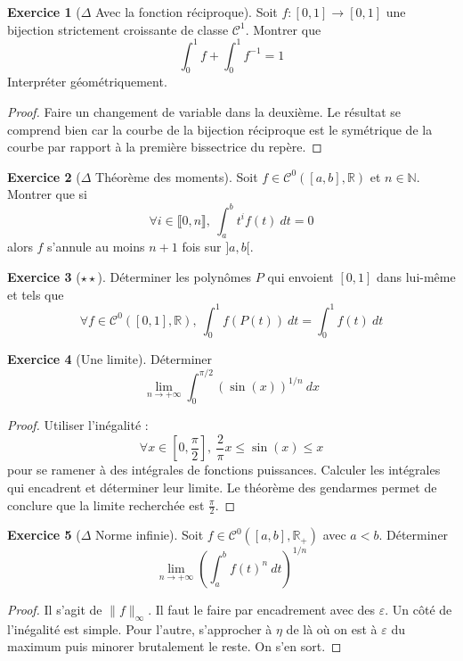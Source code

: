 \documentclass[french]{book}
\newcommand{\N}{\mathbb{N}}
\newcommand{\R}{\mathbb{R}}
\newcommand{\inv}{^{-1}}
\theoremstyle{definition}
\newtheorem{ex}{Exercice}[chapter]
\theoremstyle{theorem}
\theoremstyle{remark}
\begin{document}
\begin{ex}[$\Delta$ Avec la fonction réciproque]
	Soit $f:[0,1]\to[0,1]$ une bijection strictement croissante de classe $\mathcal{C}^1$. Montrer que $$\int_{0}^{1}f+\int_{0}^{1}f\inv=1$$ Interpréter géométriquement.
\end{ex}

\begin{proof}
	Faire un changement de variable dans la deuxième. Le résultat se comprend bien car la courbe de la bijection réciproque est le symétrique de la courbe par rapport à la première bissectrice du repère.
\end{proof}

\begin{ex}[$\Delta$ Théorème des moments]
	Soit $f\in\mathcal{C}^0([a,b],\R)$ et $n\in\N$. Montrer que si $$\forall i\in\llbracket0,n\rrbracket,\ \int_{a}^{b}t^if(t)\ dt=0$$ alors $f$ s'annule au moins $n+1$ fois sur $]a,b[$.
\end{ex}

\begin{ex}[$\star\star$]
	Déterminer les polynômes $P$ qui envoient $[0,1]$ dans lui-même et tels que $$\forall f\in\mathcal{C}^0([0,1],\R),\ \int_{0}^{1}f(P(t))\ dt=\int_{0}^{1}f(t)\ dt$$
\end{ex}

\begin{ex}[Une limite]
	Déterminer $$\lim_{{n\to+\infty}}\int_{0}^{\pi/2}(\sin(x))^{1/n}\ dx$$
\end{ex}

\begin{proof}
	Utiliser l'inégalité :$$\forall x\in\left[0,\frac{\pi}{2}\right],\ \frac{2}{\pi}x\leqslant\sin(x)\leqslant x$$ pour se ramener à des intégrales de fonctions puissances. Calculer les intégrales qui encadrent et déterminer leur limite. Le théorème des gendarmes permet de conclure que la limite recherchée est $\displaystyle\frac{\pi}{2}$.
\end{proof}

\begin{ex}[$\Delta$ Norme infinie]
	Soit $f\in\mathcal{C}^0([a,b],\R_+)$ avec $a<b$. Déterminer $$\lim_{n\to+\infty}\left(\int_{a}^{b}f(t)^{n}\ dt\right)^{1/n}$$
\end{ex}

\begin{proof}
	Il s'agit de $\lVert f\rVert_\infty$. Il faut le faire par encadrement avec des $\varepsilon$. Un côté de l'inégalité est simple. Pour l'autre, s'approcher à $\eta$ de là où on est à $\varepsilon$ du maximum puis minorer brutalement le reste. On s'en sort.
\end{proof}
\end{document}
